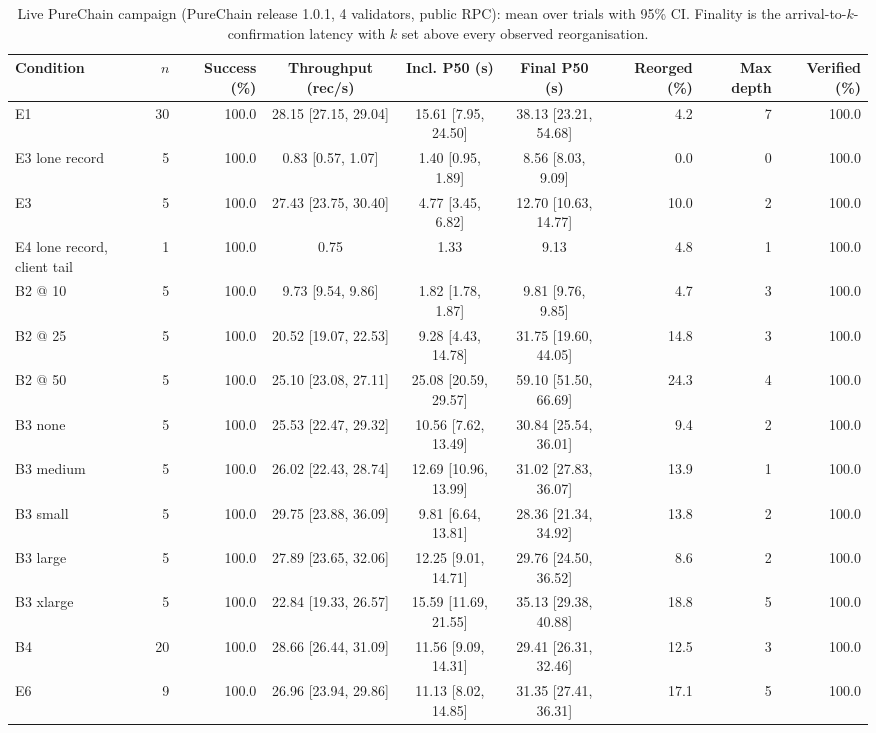 \begin{table}[t]
\centering
\scriptsize
\caption{Live PureChain campaign (PureChain release 1.0.1, 4 validators, public RPC): mean over trials with 95\% CI. Finality is the arrival-to-$k$-confirmation latency with $k$ set above every observed reorganisation.}
\label{tab:live}
\begin{adjustbox}{max width=\textwidth}
\begin{tabular}{lrrcccrrr}
\toprule
Condition & $n$ & Success (\%) & Throughput (rec/s) & Incl. P50 (s) & Final P50 (s) & Reorged (\%) & Max depth & Verified (\%) \\
\midrule
E1 & 30 & 100.0 & 28.15 [27.15, 29.04] & 15.61 [7.95, 24.50] & 38.13 [23.21, 54.68] & 4.2 & 7 & 100.0 \\
E3 lone record & 5 & 100.0 & 0.83 [0.57, 1.07] & 1.40 [0.95, 1.89] & 8.56 [8.03, 9.09] & 0.0 & 0 & 100.0 \\
E3 & 5 & 100.0 & 27.43 [23.75, 30.40] & 4.77 [3.45, 6.82] & 12.70 [10.63, 14.77] & 10.0 & 2 & 100.0 \\
E4 lone record, client tail & 1 & 100.0 & 0.75 & 1.33 & 9.13 & 4.8 & 1 & 100.0 \\
B2 @ 10 & 5 & 100.0 & 9.73 [9.54, 9.86] & 1.82 [1.78, 1.87] & 9.81 [9.76, 9.85] & 4.7 & 3 & 100.0 \\
B2 @ 25 & 5 & 100.0 & 20.52 [19.07, 22.53] & 9.28 [4.43, 14.78] & 31.75 [19.60, 44.05] & 14.8 & 3 & 100.0 \\
B2 @ 50 & 5 & 100.0 & 25.10 [23.08, 27.11] & 25.08 [20.59, 29.57] & 59.10 [51.50, 66.69] & 24.3 & 4 & 100.0 \\
B3 none & 5 & 100.0 & 25.53 [22.47, 29.32] & 10.56 [7.62, 13.49] & 30.84 [25.54, 36.01] & 9.4 & 2 & 100.0 \\
B3 medium & 5 & 100.0 & 26.02 [22.43, 28.74] & 12.69 [10.96, 13.99] & 31.02 [27.83, 36.07] & 13.9 & 1 & 100.0 \\
B3 small & 5 & 100.0 & 29.75 [23.88, 36.09] & 9.81 [6.64, 13.81] & 28.36 [21.34, 34.92] & 13.8 & 2 & 100.0 \\
B3 large & 5 & 100.0 & 27.89 [23.65, 32.06] & 12.25 [9.01, 14.71] & 29.76 [24.50, 36.52] & 8.6 & 2 & 100.0 \\
B3 xlarge & 5 & 100.0 & 22.84 [19.33, 26.57] & 15.59 [11.69, 21.55] & 35.13 [29.38, 40.88] & 18.8 & 5 & 100.0 \\
B4 & 20 & 100.0 & 28.66 [26.44, 31.09] & 11.56 [9.09, 14.31] & 29.41 [26.31, 32.46] & 12.5 & 3 & 100.0 \\
E6 & 9 & 100.0 & 26.96 [23.94, 29.86] & 11.13 [8.02, 14.85] & 31.35 [27.41, 36.31] & 17.1 & 5 & 100.0 \\

\end{tabular}
\end{adjustbox}
\end{table}
